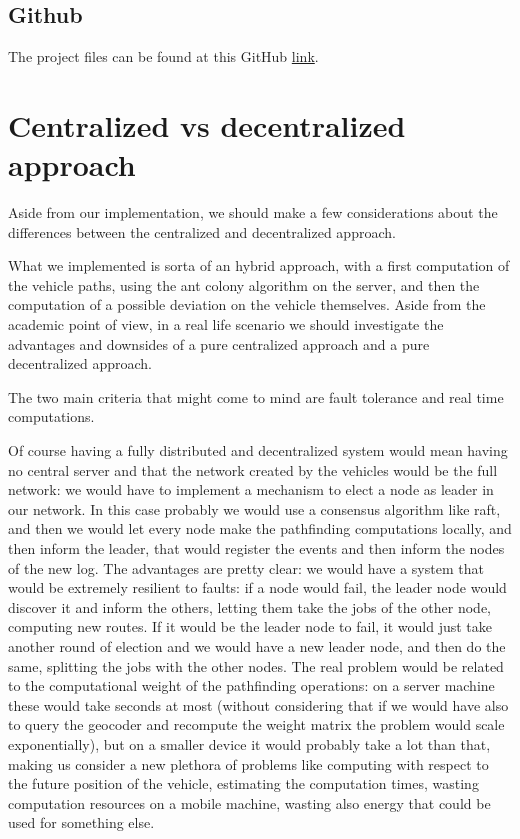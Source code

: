 \documentclass[titlepage]{article}
\begin{document}
\subsection{Github}
The project files can be found at this GitHub \href{https://github.com/MTheHead61/DS_project.git}{link}.

\section{Centralized vs decentralized approach}
Aside from our implementation, we should make a few considerations about the differences between the centralized and decentralized approach.

What we implemented is sorta of an hybrid approach, with a first computation of the vehicle paths, using the ant colony algorithm on the server, and then the computation of a possible deviation on the vehicle themselves. Aside from the academic point of view, in a real life scenario we should investigate the advantages and downsides of a pure centralized approach and a pure decentralized approach.

The two main criteria that might come to mind are fault tolerance and real time computations.

Of course having a fully distributed and decentralized system would mean having no central server and that the network created by the vehicles would be the full network: we would have to implement a mechanism to elect a node as leader in our network. In this case probably we would use a consensus algorithm like raft, and then we would let every node make the pathfinding computations locally, and then inform the leader, that would register the events and then inform the nodes of the new log. The advantages are pretty clear: we would have a system that would be extremely resilient to faults: if a node would fail, the leader node would discover it and inform the others, letting them take the jobs of the other node, computing new routes. If it would be the leader node to fail, it would just take another round of election and we would have a new leader node, and then do the same, splitting the jobs with the other nodes. The real problem would be related to the computational weight of the pathfinding operations: on a server machine these would take seconds at most (without considering that if we would have also to query the geocoder and recompute the weight matrix the problem would scale exponentially), but on a smaller device it would probably take a lot than that, making us consider a new plethora of problems like computing with respect to the future position of the vehicle, estimating the computation times, wasting computation resources on a mobile machine, wasting also energy that could be used for something else.
\end{document}

